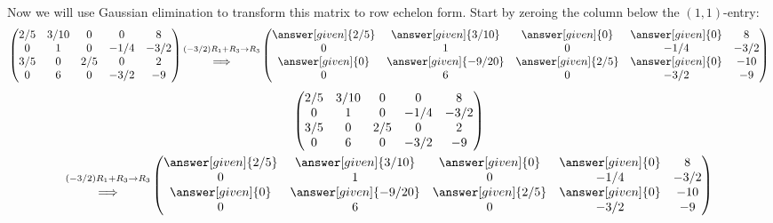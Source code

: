 \documentclass{ximera}
\begin{document}
\begin{example}
\begin{explanation}
Now we will use Gaussian elimination to transform this matrix to row echelon form. Start by zeroing the column below the $(1,1)$-entry:
\[
  \begin{pmatrix}
    {2/5}&  {3/10} & {0} &{0} &8 \\
    {0}&  {1} & {0} &{-1/4} & -3/2\\
    {3/5}&  {0} & {2/5} &{0} &2\\
    {0}&  {6} & {0} &{-3/2} &-9
  \end{pmatrix}
  \begin{matrix}
    \scriptstyle(-3/2) R_1 + R_3\to R_3\\
    \Longrightarrow
  \end{matrix}
  \begin{pmatrix}
    \answer[given]{2/5}&  \answer[given]{3/10} & \answer[given]{0} &\answer[given]{0} &8 \\
    {0}&  {1} & {0} &{-1/4} & -3/2\\
    \answer[given]{0}&  \answer[given]{-9/20} & \answer[given]{2/5} &\answer[given]{0} &-10\\
    {0}&  {6} & {0} &{-3/2} &-9
  \end{pmatrix}
\]
\begin{multline*}
  \begin{pmatrix}
    {2/5}&  {3/10} & {0} &{0} &8 \\
    {0}&  {1} & {0} &{-1/4} & -3/2\\
    {3/5}&  {0} & {2/5} &{0} &2\\
    {0}&  {6} & {0} &{-3/2} &-9
  \end{pmatrix} \\
  \begin{matrix}
    \scriptstyle(-3/2) R_1 + R_3\to R_3\\
    \Longrightarrow
  \end{matrix}
  \begin{pmatrix}
    \answer[given]{2/5}&  \answer[given]{3/10} & \answer[given]{0} &\answer[given]{0} &8 \\
    {0}&  {1} & {0} &{-1/4} & -3/2\\
    \answer[given]{0}&  \answer[given]{-9/20} & \answer[given]{2/5} &\answer[given]{0} &-10\\
    {0}&  {6} & {0} &{-3/2} &-9
  \end{pmatrix}

\end{multline*}
\end{explanation}
\end{example}
\end{document}
